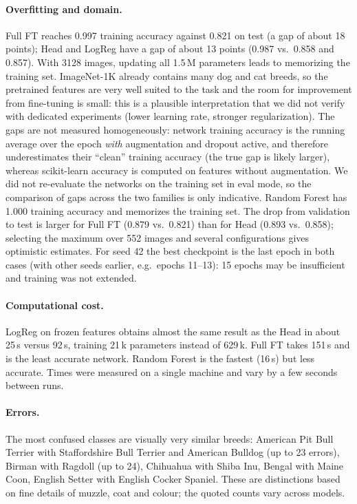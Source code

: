\documentclass[11pt,a4paper]{article}
\begin{document}
\paragraph{Overfitting and domain.} Full FT reaches 0.997 training accuracy against 0.821 on
test (a gap of about 18 points); Head and LogReg have a gap of about 13 points (0.987 vs.\
0.858 and 0.857). With 3128 images, updating all 1.5\,M parameters leads to memorizing the
training set. ImageNet-1K already contains many dog and cat breeds, so the pretrained features
are very well suited to the task and the room for improvement from fine-tuning is small: this
is a plausible interpretation that we did not verify with dedicated experiments (lower learning
rate, stronger regularization). The gaps are not measured homogeneously: network training
accuracy is the running average over the epoch \emph{with} augmentation and dropout active, and
therefore underestimates their ``clean'' training accuracy (the true gap is likely larger),
whereas scikit-learn accuracy is computed on features without augmentation. We did not
re-evaluate the networks on the training set in eval mode, so the comparison of gaps across the
two families is only indicative. Random Forest has 1.000 training accuracy and memorizes the
training set. The drop from validation to test is larger for Full FT (0.879 vs.\ 0.821) than for
Head (0.893 vs.\ 0.858); selecting the maximum over 552 images and several configurations gives
optimistic estimates. For seed 42 the best checkpoint is the last epoch in both cases (with
other seeds earlier, e.g.\ epochs 11--13): 15 epochs may be insufficient and training was not
extended.

\paragraph{Computational cost.} LogReg on frozen features obtains almost the same result as the
Head in about 25\,s versus 92\,s, training 21\,k parameters instead of 629\,k. Full FT takes
151\,s and is the least accurate network. Random Forest is the fastest (16\,s) but less
accurate. Times were measured on a single machine and vary by a few seconds between runs.

\paragraph{Errors.} The most confused classes are visually very similar breeds: American Pit
Bull Terrier with Staffordshire Bull Terrier and American Bulldog (up to 23 errors), Birman with
Ragdoll (up to 24), Chihuahua with Shiba Inu, Bengal with Maine Coon, English Setter with
English Cocker Spaniel. These are distinctions based on fine details of muzzle, coat and colour;
the quoted counts vary across models.
\end{document}
